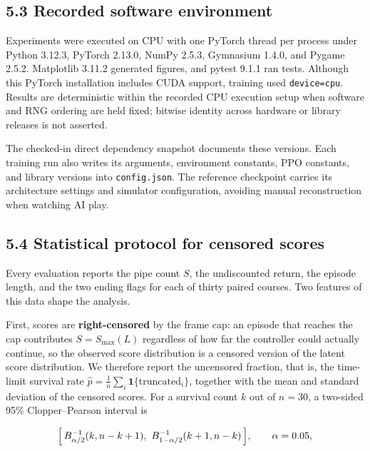 \documentclass[
  11pt,
]{article}
\begin{document}
\subsection{5.3 Recorded software
environment}\label{recorded-software-environment}

Experiments were executed on CPU with one PyTorch thread per process
under Python 3.12.3, PyTorch 2.13.0, NumPy 2.5.3, Gymnasium 1.4.0, and
Pygame 2.5.2. Matplotlib 3.11.2 generated figures, and pytest 9.1.1 ran
tests. Although this PyTorch installation includes CUDA support,
training used \texttt{device=cpu}. Results are deterministic within the
recorded CPU execution setup when software and RNG ordering are held
fixed; bitwise identity across hardware or library releases is not
asserted.

The checked-in direct dependency snapshot documents these versions. Each
training run also writes its arguments, environment constants, PPO
constants, and library versions into \texttt{config.json}. The reference
checkpoint carries its architecture settings and simulator
configuration, avoiding manual reconstruction when watching AI play.

\subsection{5.4 Statistical protocol for censored
scores}\label{statistical-protocol-for-censored-scores}

Every evaluation reports the pipe count \(S\), the undiscounted return,
the episode length, and the two ending flags for each of thirty paired
courses. Two features of this data shape the analysis.

First, scores are \textbf{right-censored} by the frame cap: an episode
that reaches the cap contributes \(S=S_{\max}(L)\) regardless of how far
the controller could actually continue, so the observed score
distribution is a censored version of the latent score distribution. We
therefore report the uncensored fraction, that is, the time-limit
survival rate \(\hat p=\frac1n\sum_i\mathbf 1\{\text{truncated}_i\}\),
together with the mean and standard deviation of the censored scores.
For a survival count \(k\) out of \(n=30\), a two-sided 95\%
Clopper--Pearson interval is

\[
\Bigl[\,B^{-1}_{\alpha/2}(k,n-k+1),\ B^{-1}_{1-\alpha/2}(k+1,n-k)\,\Bigr],\qquad \alpha=0.05,
\]
\end{document}
